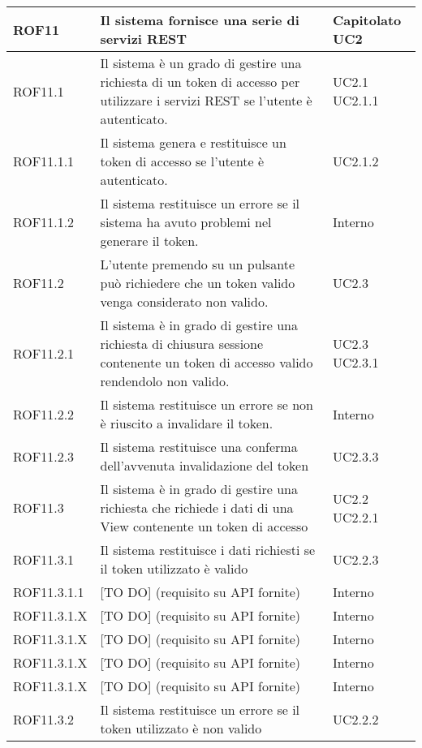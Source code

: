 \begin{center}
\begin{longtable}{| p{2.5cm} | p{8cm} | p{2cm} |}

		ROF11  &  Il sistema fornisce una serie di servizi REST  & Capitolato \newline UC2 \\
		\hline
		ROF11.1  &  Il sistema è un grado di gestire una richiesta di un token di accesso per utilizzare i servizi REST se l'utente è autenticato.  & UC2.1 \newline UC2.1.1 \\
		\hline
		ROF11.1.1  &  Il sistema genera e restituisce un token di accesso se l'utente è autenticato. & UC2.1.2 \\
		\hline
		ROF11.1.2  &  Il sistema restituisce un errore se il sistema ha avuto problemi nel generare il token. & Interno \\
		\hline
		ROF11.2  &  L'utente premendo su un pulsante può richiedere che un token valido venga considerato non valido.  & UC2.3  \\
		\hline
		ROF11.2.1  &  Il sistema è in grado di gestire una richiesta di chiusura sessione contenente un token di accesso valido rendendolo non valido. & UC2.3 \newline UC2.3.1 \\
		\hline
		ROF11.2.2  &  Il sistema restituisce un errore se non è riuscito a invalidare il token. & Interno \\
		\hline
		ROF11.2.3  &  Il sistema restituisce una conferma dell'avvenuta invalidazione del token & UC2.3.3 \\
		\hline
		ROF11.3  &  Il sistema è in grado di gestire una richiesta che richiede i dati di una View contenente un token di accesso  &  UC2.2 \newline UC2.2.1 \\
		\hline
		ROF11.3.1  &  Il sistema restituisce i dati richiesti se il token utilizzato è valido  &  UC2.2.3 \\
		\hline
		ROF11.3.1.1 & [TO DO] (requisito su API fornite) & Interno \\
		\hline
		ROF11.3.1.X & [TO DO] (requisito su API fornite) & Interno \\
		\hline
		ROF11.3.1.X & [TO DO] (requisito su API fornite) & Interno \\
		\hline
		ROF11.3.1.X & [TO DO] (requisito su API fornite) & Interno \\
		\hline
		ROF11.3.1.X & [TO DO] (requisito su API fornite) & Interno \\
		\hline
		ROF11.3.2  &  Il sistema restituisce un errore se il token utilizzato è non valido  &  UC2.2.2 \\
		\hline

	\end{longtable}
	\egroup
\end{center}


